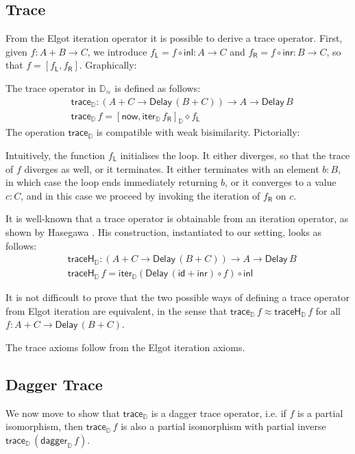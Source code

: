 \documentclass[runningheads,a4paper]{llncs}
\newcommand{\comp}{\circ}
\newcommand{\inl}{\mathsf{inl}}
\newcommand{\inr}{\mathsf{inr}}
\newcommand{\mapL}[1]{#1_{\mathsf{L}}}
\newcommand{\mapR}[1]{#1_{\mathsf{R}}}
\newcommand{\id}{\mathsf{id}}
\newcommand{\Delay}{\ensuremath{\mathsf{Delay}\,}}
\newcommand{\now}{\mathsf{now}}
\newcommand{\D}{\mathbb{D}}
\newcommand{\Dapprox}{\mathbb{D}_{\approx}}
\newcommand{\copairD}[2]{[#1,#2]_{\D}}
\newcommand{\iterD}{\mathsf{iter}_\D}
\newcommand{\traceD}{\mathsf{trace}_\D}
\newcommand{\traceHD}{\mathsf{traceH}_\D}
\newcommand{\daggerD}{\mathsf{dagger}_\D}
\begin{document}
\subsection{Trace}\label{sec:trace}

From the Elgot iteration operator it is possible to derive a trace
operator. First, given $f : A + B \to C$, we introduce
$\mapL f = f \comp \inl : A \to C$ and
$\mapR f = f \comp \inr : B \to C$, so that $f = [\mapL f , \mapR f]$.
Graphically:
 
The trace operator in $\Dapprox$ is defined as follows:
\begin{align*}
& \traceD : (A + C \to \Delay (B + C)) \to A \to \Delay B \\
& \traceD \,f = \copairD{\now}{\iterD \,\mapR f}\diamond \mapL f
\end{align*}
The operation $\traceD$ is compatible with weak bisimilarity. 
Pictorially:


Intuitively, the function $\mapL f$ initialises the loop. It either
diverges, so that the trace of $f$ diverges as well, or it terminates. It either terminates with
an element $b : B$, in which case the loop ends immediately returning
$b$, or it converges to a value $c : C$, and in this case we proceed
by  invoking the iteration of $\mapR f$ on $c$.

It is well-known that a trace operator is obtainable from an iteration
operator, as shown by Hasegawa  \cite{Hasegawa97}. His construction,
instantiated to our setting, looks as follows:
\begin{align*}
& \traceHD : (A + C \to \Delay (B + C)) \to A \to \Delay B \\
& \traceHD \,f = \iterD (\Delay (\id + \inr) \comp f) \comp \inl
\end{align*}

It is not difficoult to prove that the two possible ways of defining a
trace operator from Elgot iteration are equivalent, in the sense that
$\traceD\,f \approx \traceHD\,f$ for all $f : A + C \to \Delay (B +
C)$. 

The trace axioms follow from the Elgot iteration axioms.

\subsection{Dagger Trace}\label{sec:daggertrace}

We now move to show that $\traceD$ is a dagger trace operator,
i.e. if $f$ is a partial isomorphism, then
$\traceD\,f$ is also a partial isomorphism with partial inverse $\traceD\,(\daggerD\,f)$.
\end{document}
